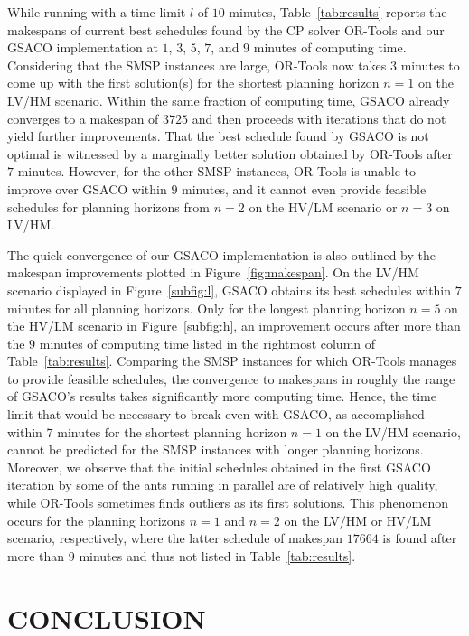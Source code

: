 \documentclass[runningheads]{llncs}
\begin{document}
%
While running with a time limit $l$ of $10$ minutes,
Table~\ref{tab:results} reports the makespans of current best schedules
found by the CP solver OR-Tools and our GSACO implementation
at $1$, $3$, $5$, $7$, and $9$ minutes of computing time.
Considering that the SMSP instances are large,
OR-Tools now takes $3$ minutes to come up with the first solution(s)
for the shortest planning horizon $n=1$ on the LV/HM scenario.
Within the same fraction of computing time, GSACO already converges to a
makespan of $3725$ and then proceeds with iterations that do not
yield further improvements.
That the best schedule found by GSACO is not optimal is witnessed by a
marginally better solution obtained by OR-Tools after $7$ minutes.
However, for the other SMSP instances, OR-Tools is unable to improve over
GSACO within $9$ minutes, and it cannot even provide feasible schedules
for planning horizons from $n=2$ on the HV/LM scenario or $n=3$ 
on LV/HM.

The quick convergence of our GSACO implementation is also outlined by the makespan improvements plotted in Figure~\ref{fig:makespan}.
On the LV/HM scenario displayed in Figure~\ref{subfig:l}, 
GSACO obtains its best schedules within $7$ minutes
for all planning horizons.
Only for the longest planning horizon $n=5$
on the HV/LM scenario in Figure~\ref{subfig:h},
an improvement occurs after more than the $9$ minutes of computing time
listed in the rightmost column of Table~\ref{tab:results}.
Comparing the SMSP instances for which OR-Tools manages to provide
feasible schedules,
the convergence to makespans in roughly the range of GSACO's results
takes significantly more computing time.
Hence, the time limit that would be necessary to break even with GSACO,
as accomplished within $7$ minutes for the shortest planning horizon
$n=1$ on the LV/HM scenario,
cannot be predicted for the SMSP instances with longer planning horizons.
Moreover, we observe that the initial schedules obtained 
in the first GSACO iteration by some of the ants running in parallel are of relatively high quality, while
OR-Tools sometimes finds outliers as its first solutions.
This phenomenon occurs for the planning horizons $n=1$ and $n=2$
on the LV/HM or HV/LM scenario, respectively, where the latter
schedule of makespan $17664$ is found after more than $9$ minutes
and thus not listed in Table~\ref{tab:results}.

\section{\uppercase{Conclusion}}
\label{sec:conclusion}
\end{document}
